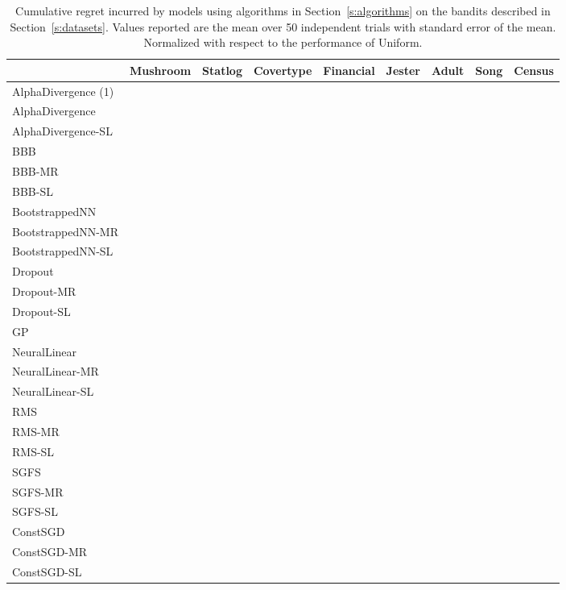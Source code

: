 \documentclass{article} \usepackage{iclr2018_conference,times}
\begin{document}
\begin{landscape}
\begin{table}[ht]
  \caption{Cumulative regret incurred by models using algorithms in Section~\ref{s:algorithms} on the bandits described in Section~\ref{s:datasets}. Values reported are the mean over 50 independent trials with standard error of the mean. Normalized with respect to the performance of Uniform.}
  \label{tab:nonlinear_cum_regret_appendix}
  \centering
  \footnotesize
  \tiny
	\vspace*{\fill}
	\begin{adjustbox}{center}
	\begin{tabular}{lllllllll}
 & Mushroom & Statlog & Covertype & Financial & Jester & Adult & Song & Census \\
\midrule
AlphaDivergence (1) & & & & & & & &  \\
AlphaDivergence & & & & & & & &  \\
AlphaDivergence-SL & & & & & & & &  \\
BBB & & & & & & & &  \\
BBB-MR & & & & & & & &  \\
BBB-SL & & & & & & & &  \\
BootstrappedNN & & & & & & & &  \\
BootstrappedNN-MR & & & & & & & &  \\
BootstrappedNN-SL & & & & & & & &  \\
Dropout & & & & & & & &  \\
Dropout-MR & & & & & & & &  \\
Dropout-SL & & & & & & & &  \\
GP & & & & & & & &  \\
NeuralLinear & & & & & & & &  \\
NeuralLinear-MR & \bm{}& & & & & & &  \\
NeuralLinear-SL & & \bm{}& & & & & &  \\
RMS & & & & & & & &  \\
RMS-MR & & & & & & & &  \\
RMS-SL & & & & & & & &  \\
SGFS & & & & & & & &  \\
SGFS-MR & & & & & & & &  \\
SGFS-SL & & & & & & & &  \\
ConstSGD & & & \bm{}& & & & &  \\
ConstSGD-MR & & & & & & & &  \\
ConstSGD-SL & & & \bm{}& & & & &  \\

\end{tabular}
\end{adjustbox}
\end{table}
\end{landscape}
\end{document}
